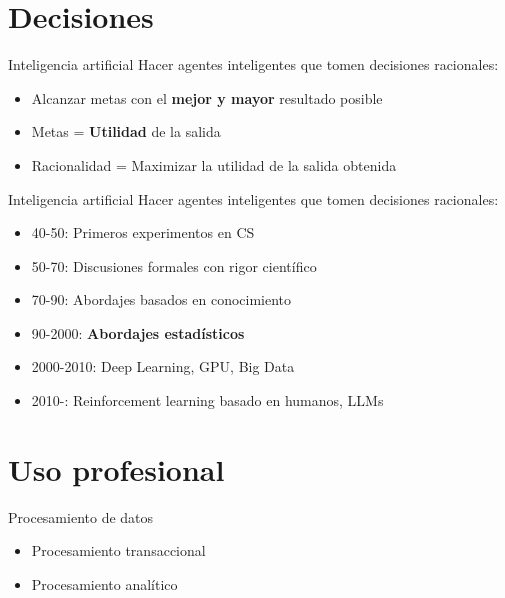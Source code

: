 \documentclass[aspectratio=169]{beamer}
\begin{document}
\section*{Decisiones}
\begin{frame}{Inteligencia artificial}
Hacer agentes inteligentes que tomen decisiones racionales:

\begin{itemize}
	\item Alcanzar metas con el \textbf{mejor y mayor} resultado posible
	\item Metas = \textbf{Utilidad} de la salida
	\item Racionalidad = Maximizar la utilidad de la salida obtenida
\end{itemize}

\end{frame}

\begin{frame}{Inteligencia artificial}
Hacer agentes inteligentes que tomen decisiones racionales:

\begin{itemize}
	\item 40-50: Primeros experimentos en CS
	\item 50-70: Discusiones formales con rigor científico
	\item 70-90: Abordajes basados en conocimiento
	\item 90-2000: \textbf{Abordajes estadísticos}
	\item 2000-2010: Deep Learning, GPU, Big Data
	\item 2010-: Reinforcement learning basado en humanos, LLMs
\end{itemize}

\end{frame}

\section{Uso profesional}


\begin{frame}{Procesamiento de datos}
	\begin{itemize}
		\item Procesamiento transaccional
		\item Procesamiento analítico	
	\end{itemize}
\end{frame}
\end{document}
